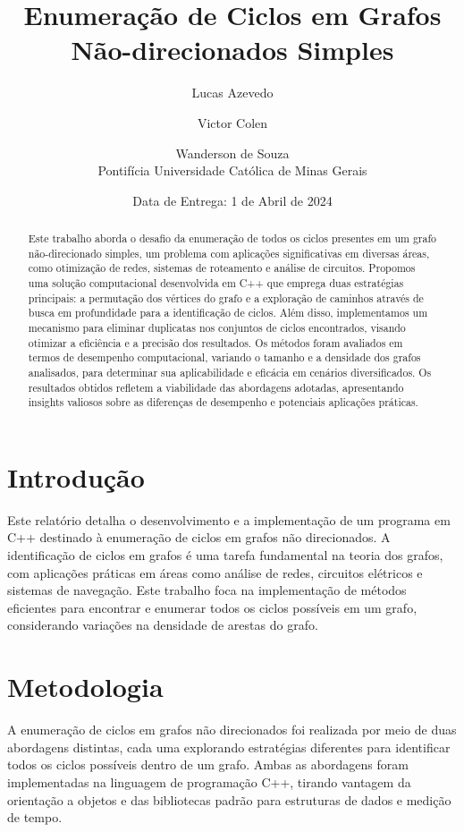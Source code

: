 \documentclass{article}
\title{Enumeração de Ciclos em Grafos Não-direcionados Simples}
\author{Lucas Azevedo\and Victor Colen \and Wanderson de Souza\\ Pontifícia Universidade Católica de Minas Gerais}
\date{Data de Entrega: 1 de Abril de 2024}
\begin{document}
\maketitle

\begin{abstract}
Este trabalho aborda o desafio da enumeração de todos os ciclos presentes em um grafo não-direcionado simples, um problema com aplicações significativas em diversas áreas, como otimização de redes, sistemas de roteamento e análise de circuitos. Propomos uma solução computacional desenvolvida em C++ que emprega duas estratégias principais: a permutação dos vértices do grafo e a exploração de caminhos através de busca em profundidade para a identificação de ciclos. Além disso, implementamos um mecanismo para eliminar duplicatas nos conjuntos de ciclos encontrados, visando otimizar a eficiência e a precisão dos resultados. Os métodos foram avaliados em termos de desempenho computacional, variando o tamanho e a densidade dos grafos analisados, para determinar sua aplicabilidade e eficácia em cenários diversificados. Os resultados obtidos refletem a viabilidade das abordagens adotadas, apresentando insights valiosos sobre as diferenças de desempenho e potenciais aplicações práticas.
\end{abstract}


\section{Introdução}
Este relatório detalha o desenvolvimento e a implementação de um programa em C++ destinado à enumeração de ciclos em grafos não direcionados. A identificação de ciclos em grafos é uma tarefa fundamental na teoria dos grafos, com aplicações práticas em áreas como análise de redes, circuitos elétricos e sistemas de navegação. Este trabalho foca na implementação de métodos eficientes para encontrar e enumerar todos os ciclos possíveis em um grafo, considerando variações na densidade de arestas do grafo.


\section{Metodologia}

A enumeração de ciclos em grafos não direcionados foi realizada por meio de duas abordagens distintas, cada uma explorando estratégias diferentes para identificar todos os ciclos possíveis dentro de um grafo. Ambas as abordagens foram implementadas na linguagem de programação C++, tirando vantagem da orientação a objetos e das bibliotecas padrão para estruturas de dados e medição de tempo.
\end{document}
